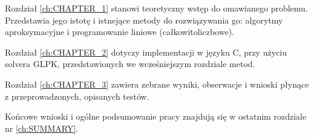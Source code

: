 Rozdział \ref{ch:CHAPTER_1} stanowi teoretyczny wstęp do omawianego problemu. Przedstawia jego istotę i istnejące metody do rozwiązywania go: algorytmy aproksymacyjne i programowanie liniowe (całkowitoliczbowe).

Rozdział \ref{ch:CHAPTER_2} dotyczy implementacji w języku C, przy użyciu solvera GLPK, przedstawionych we wcześniejszym rozdziale metod.

Rozdział \ref{ch:CHAPTER_3} zawiera zebrane wyniki, obserwacje i wnioski płynące z przeprowadzonych, opisanych testów. 

Końcowe wnioski i ogólne podsumowanie pracy znajdują się w ostatnim rozdziale nr \ref{ch:SUMMARY}.





